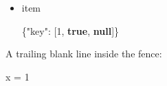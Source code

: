 \documentclass[
]{article}
\newenvironment{Shaded}{}{}
\newcommand{\DataTypeTok}[1]{\textcolor[rgb]{0.56,0.13,0.00}{#1}}
\newcommand{\DecValTok}[1]{\textcolor[rgb]{0.25,0.63,0.44}{#1}}
\newcommand{\FunctionTok}[1]{\textcolor[rgb]{0.02,0.16,0.49}{#1}}
\newcommand{\KeywordTok}[1]{\textcolor[rgb]{0.00,0.44,0.13}{\textbf{#1}}}
\newcommand{\NormalTok}[1]{#1}
\newcommand{\OperatorTok}[1]{\textcolor[rgb]{0.40,0.40,0.40}{#1}}
\newcommand{\OtherTok}[1]{\textcolor[rgb]{0.00,0.44,0.13}{#1}}
\begin{document}
\begin{itemize}
\item
  item

\begin{Shaded}
\begin{Highlighting}[]
\FunctionTok{\{}\DataTypeTok{"key"}\FunctionTok{:} \OtherTok{[}\DecValTok{1}\OtherTok{,} \KeywordTok{true}\OtherTok{,} \KeywordTok{null}\OtherTok{]}\FunctionTok{\}}
\end{Highlighting}
\end{Shaded}
\end{itemize}

A trailing blank line inside the fence:

\begin{Shaded}
\begin{Highlighting}[]
\NormalTok{x }\OperatorTok{=} \DecValTok{1}
\end{Highlighting}
\end{Shaded}
\end{document}
